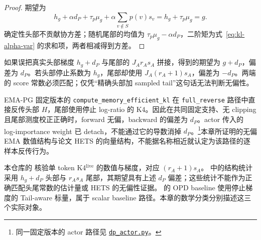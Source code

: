 \begin{proof}
期望为
\[
 h_g+\alpha d_P+\tau_p\mu_g+\alpha\sum_{v\notin S}p(v)s_v
 =h_g+\tau_p\mu_g=g.
\]
确定性头部不贡献协方差；随机尾部的均值为 $\tau_p\mu_g-\alpha d_P$，二阶矩为式~\eqref{eq:kl-alpha-var} 的求和项，两者相减得到方差。
\end{proof}

如果误把真实头部梯度 $h_g+d_P$ 与尾部的 $J_Ar_As_A$ 拼接，得到的期望为 $g+d_P$，偏差为 $d_P$。若头部停止系数为 $h_g$，尾部却使用 $J_A(r_A+1)s_A$，偏差为 $-d_P$。两端的 score 常数必须匹配；仅凭“精确头部加 sampled tail”这句话无法判断无偏性。

EMA-PG 固定版本的 \texttt{compute\_memory\_efficient\_kl} 在 \texttt{full\_reverse} 路径中直接反传头部 $H$，尾部使用停止 log-ratio 的 K4。因此在共同固定支持、无 clipping 且尾部测度校正正确时，forward 无偏，backward 的偏差为 $d_P$。actor 传入的 log-importance weight 已 detach，不能通过它的导数消掉 $d_P$。\footnote{同一固定版本的 actor 路径见 \href{https://github.com/LunjunZhang/ema-pg/blob/f9b977632ad948ce935432a517c22291bfaba562/search/verl/workers/actor/dp_actor.py}{\texttt{dp\_actor.py}}。}本章所证明的无偏 EMA 数值结构与论文 HETS 的向量结构，不能据名称相近就认定为该路径的逐样本反传行为。

本仓库的  核验单 token K4$^{\mathrm{live}}$ 的数值与梯度，对应 $(r_A+1)s_A$。 中的结构统计采用 $h_g+d_P$ 头部与 $r_As_A$ 尾部，其期望具有上述 $d_P$ 偏差；这些统计不能作为正确匹配头尾常数的估计量或 HETS 的无偏性证据。 的 OPD baseline 使用停止梯度的 Tail-aware 标量，属于 scalar baseline 路径。本章的数学分类分别描述这三个实际对象。
